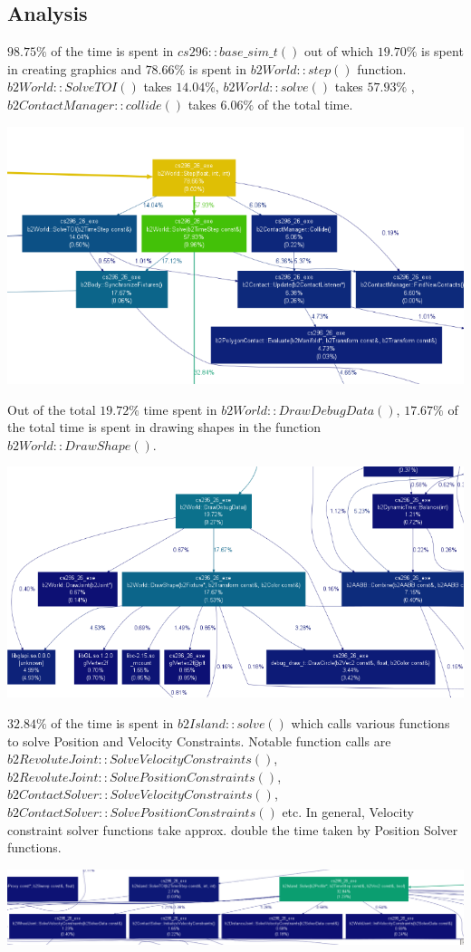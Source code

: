 \documentclass[11pt]{article}
\begin{document}
	\subsection{Analysis}
	$98.75\% $ of the time is spent in $cs296::base\_sim\_t()$ out of which $19.70\%$ is spent in creating graphics and $78.66\%$ is spent in $b2World::step()$
	function. $b2World::SolveTOI()$ takes $14.04\%$, $b2World::solve()$ takes $57.93\%$ , $b2ContactManager::collide()$ takes $6.06\%$ of the total time. 
	\begin{center}
		  \includegraphics[scale=0.60]{images/b2World_step}
	\end{center}
	Out of the total $19.72\%$ time spent in $b2World::DrawDebugData()$, $17.67\%$ of the total time is spent in drawing shapes in the function
	$b2World::DrawShape().$
	\begin{center}
		  \includegraphics[scale=0.60]{images/DrawDebugData}
	\end{center}
	$32.84\%$ of the time is spent in $b2Island::solve()$ which calls various functions to solve Position and Velocity Constraints. Notable function calls
	are $b2RevoluteJoint::SolveVelocityConstraints()$, $b2RevoluteJoint::SolvePositionConstraints()$, $b2ContactSolver::SolveVelocityConstraints()$,
	$b2ContactSolver::SolvePositionConstraints()$ etc. In general, Velocity constraint solver functions take approx. double the time taken by Position Solver 
	functions.
	\begin{center}
		  \includegraphics[scale=0.40]{images/b2Island_solve}
	\end{center} 
\end{document}
